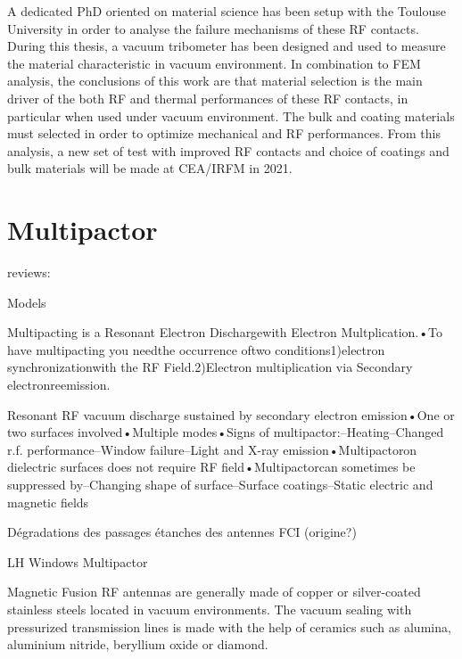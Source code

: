 {A dedicated PhD oriented on material science has been setup with the Toulouse University in order to analyse the failure mechanisms of these RF contacts. During this thesis, a vacuum tribometer has been designed and used to measure the material characteristic in vacuum environment. In combination to FEM analysis, the conclusions of this work are that material selection is the main driver of the both RF and thermal performances of these RF contacts, in particular when used under vacuum environment. The bulk and coating materials must selected in order to optimize mechanical and RF performances. From this analysis, a new set of test with improved RF contacts and choice of coatings and bulk materials will be made at CEA/IRFM in 2021.


\clearpage
\section{Multipactor}\label{sec:Multipactor}
reviews:\cite{kishek1998}

Models\cite{vaughan1989}

Multipacting is a Resonant Electron Dischargewith Electron Multplication.•To have multipacting you needthe occurrence oftwo conditions1)electron synchronizationwith the RF Field.2)Electron multiplication via Secondary electronreemission.

Resonant RF vacuum discharge sustained by secondary electron emission•One or two surfaces involved•Multiple modes•Signs of multipactor:–Heating–Changed r.f. performance–Window failure–Light and X-ray emission•Multipactoron dielectric surfaces does not require RF field•Multipactorcan sometimes be suppressed by–Changing shape of surface–Surface coatings–Static electric and magnetic fields

Dégradations des passages étanches des antennes FCI (origine?)



LH Windows Multipactor



Magnetic Fusion RF antennas are generally made of copper or silver-coated stainless steels located in vacuum environments. The vacuum sealing with pressurized transmission lines is made with the help of ceramics such as alumina, aluminium nitride, beryllium oxide or diamond. 

}
